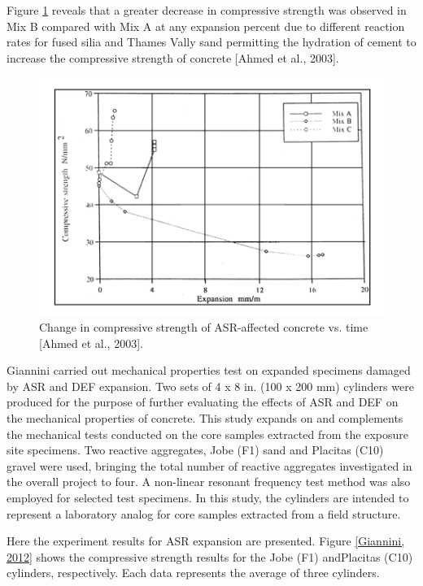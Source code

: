 Figure \ref{Ahmed et al., 2003 2} reveals that a greater decrease in compressive strength was observed in Mix B compared with Mix A at any expansion percent due to different reaction rates for fused silia and Thames Vally sand permitting the hydration of cement to increase the compressive strength of concrete [Ahmed et al., 2003]\cite{Ahmed}.

\begin{figure}[h!]
  \centering
  \includegraphics[width=0.8\linewidth]{Reference/temp2.png}
  \caption{Change in compressive strength of ASR-affected concrete vs. time [Ahmed et al., 2003\cite{Ahmed}].}
  \label{Ahmed et al., 2003 2}
\end{figure}

\clearpage

Giannini\cite{GIANNINI} carried out mechanical properties test on expanded specimens damaged by ASR and DEF expansion. Two sets of 4 x 8 in. (100 x 200 mm) cylinders were produced for the purpose of further evaluating the effects of ASR and DEF on the mechanical properties of concrete. This study expands on and complements the mechanical tests conducted on the core samples extracted from the exposure site specimens. Two reactive aggregates, Jobe (F1) sand and Placitas (C10) gravel were used, bringing the total number of reactive aggregates investigated in the overall project to four. A non-linear resonant frequency test method was also employed for selected test specimens. In this study, the cylinders are intended to represent a laboratory analog for core samples extracted from a field structure.

Here the experiment results for ASR expansion are presented. Figure \ref{Giannini, 2012} shows the compressive strength results for the Jobe (F1) andPlacitas (C10) cylinders, respectively. Each data represents the average of three cylinders.

